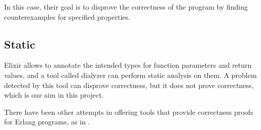 In this case, their goal is to disprove the correctness of the program by
finding counterexamples for specified properties.

\subsection{Static}
\label{sec:static}

Elixir allows to annotate the intended types for function parameters and return
values, and a tool called \gls{dialyzer} \citep{Dialyzer} can perform static
analysis on them. A problem detected by this tool can disprove correctness, but
it does not prove correctness, which is our aim in this project.

There have been other attempts in offering tools that provide correctness proofs
for Erlang programs, as in \cite{erlangveri}.
